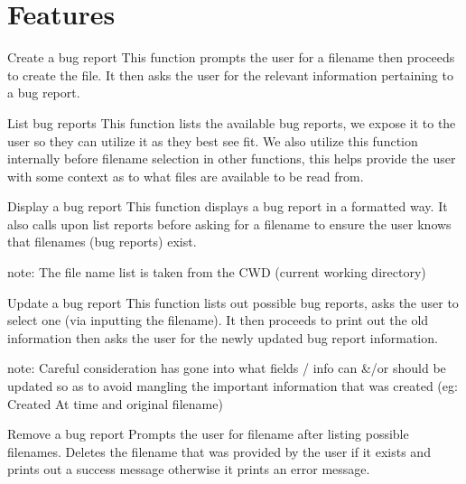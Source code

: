 \documentclass[bigger]{beamer}
\begin{document}
\section{Features}
\label{sec:orgaf31cc5}
\begin{frame}[label={sec:orgfddf93a}]{Create a bug report}
This function prompts the user for a filename then proceeds to create the file.
It then asks the user for the relevant information pertaining to a bug report.
\end{frame}
\begin{frame}[label={sec:org5721996}]{List bug reports}
This function lists the available bug reports, we expose it to the user so they can utilize it as they best see fit.
We also utilize this function internally before filename selection in other functions, this helps provide the user with some context as to what files are available to be read from.
\end{frame}
\begin{frame}[label={sec:orgb5c80dc}]{Display a bug report}
This function displays a bug report in a formatted way.
It also calls upon list reports before asking for a filename to ensure the user knows that filenames (bug reports) exist.

note: The file name list is taken from the CWD (current working directory)
\end{frame}
\begin{frame}[label={sec:org8ccd0b6}]{Update a bug report}
This function lists out possible bug reports, asks the user to select one (via inputting the filename).
It then proceeds to print out the old information then asks the user for the newly updated bug report information.

note: Careful consideration has gone into what fields / info can \&/or should be updated so as to avoid mangling the important information that was created (eg: Created At time and original filename)
\end{frame}
\begin{frame}[label={sec:org4341ab9}]{Remove a bug report}
Prompts the user for filename after listing possible filenames.
Deletes the filename that was provided by the user if it exists and prints out a success message otherwise it prints an error message.
\end{frame}
\end{document}
